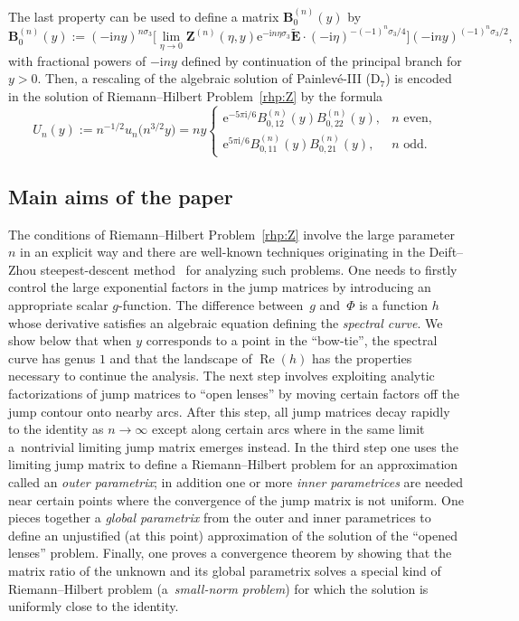 The last property can be used to define a matrix $\mathbf{B}^{(n)}_0(y)$ by
\begin{equation}
\mathbf{B}^{(n)}_0(y):=(-\mathrm{i} ny)^{n\sigma_3}\Big[\lim_{\eta\to 0}\mathbf{Z}^{(n)}(\eta,y)\mathrm{e}^{-\mathrm{i} n\eta\sigma_3}\widetilde{\mathbf{E}}\cdot(-\mathrm{i}\eta)^{-(-1)^n\sigma_3/4}\Big](-\mathrm{i} n y)^{(-1)^n\sigma_3/2},
\label{eq:B0n}
\end{equation}
with fractional powers of $-\mathrm{i} n y$ defined by continuation of the principal branch for $y>0$.
Then, a rescaling of the algebraic solution of Painlev\'e-III (D$_7$) is encoded in the solution of Riemann--Hilbert Problem~\ref{rhp:Z} by the formula
\begin{equation}
U_n(y):=n^{-1/2}u_n\bigl(n^{3/2}y\bigr) =ny\begin{cases}\mathrm{e}^{-5\pi\mathrm{i}/6}B_{0,12}^{(n)}(y)B_{0,22}^{(n)}(y),& \text{$n$ even}, \\
\mathrm{e}^{5\pi\mathrm{i}/6}B_{0,11}^{(n)}(y)B_{0,21}^{(n)}(y),& \text{$n$ odd.}
\end{cases}
\label{eq:Uny}
\end{equation}

\subsection{Main aims of the paper}
The conditions of Riemann--Hilbert Problem~\ref{rhp:Z} involve the large parameter $n$ in an explicit way and there are well-known techniques originating in the Deift--Zhou steepest-descent method~\cite{DeiftZ93} for analyzing such problems. One needs to firstly control the large exponential factors in the jump matrices by introducing an appropriate scalar $g$-function. The difference between~$g$ and~$\Phi$ is a function $h$ whose derivative satisfies an algebraic equation defining the \emph{spectral curve}. We show below that when $y$ corresponds to a point in the ``bow-tie'', the spectral curve has genus $1$ and that the landscape of $\operatorname{Re}(h)$ has the properties necessary to continue the analysis. The next step involves exploiting analytic factorizations of jump matrices to ``open lenses'' by moving certain factors off the jump contour onto nearby arcs. After this step, all jump matrices decay rapidly to the identity as $n\to\infty$ except along certain arcs where in the same limit a~nontrivial limiting jump matrix emerges instead. In the third step one uses the limiting jump matrix to define a Riemann--Hilbert problem for an approximation called an \emph{outer parametrix}; in addition one or more \emph{inner parametrices} are needed near certain points where the convergence of the jump matrix is not uniform. One pieces together a \emph{global parametrix} from the outer and inner parametrices to define an unjustified (at this point) approximation of the solution of the ``opened lenses'' problem. Finally, one proves a convergence theorem by showing that the matrix ratio of the unknown and its global parametrix solves a special kind of Riemann--Hilbert problem (a~\emph{small-norm problem}) for which the solution is uniformly close to the identity.

